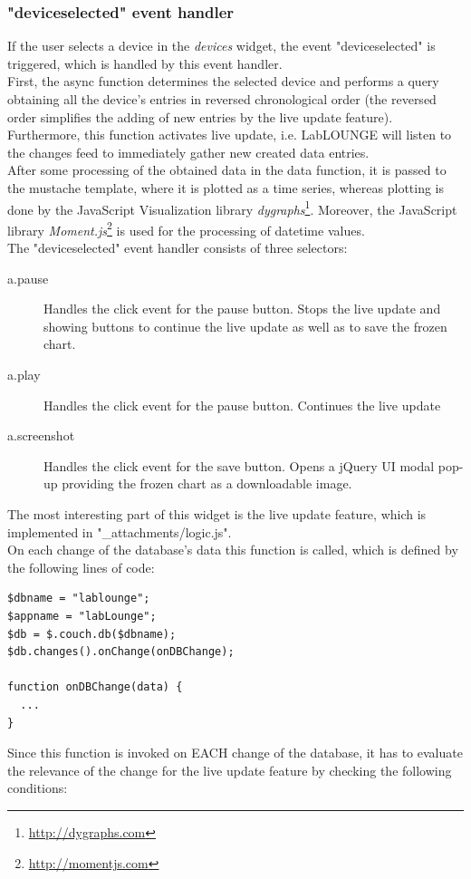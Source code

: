 \subsubsection{"deviceselected" event handler}
\label{couchapp:labloungedeveloper:main:deviceselected}
If the user selects a device in the \emph{devices} widget, the event "deviceselected" is triggered, which is handled by this event handler.\\
First, the async function determines the selected device and performs a query obtaining all the device's entries in reversed chronological order (the reversed order simplifies the adding of new entries by the live update feature). Furthermore, this function activates live update, i.e. LabLOUNGE will listen to the changes feed to immediately gather new created data entries.\\
After some processing of the obtained data in the data function, it is passed to the mustache template, where it is plotted as a time series, whereas plotting is done by the JavaScript Visualization library \emph{dygraphs}\footnote{\url{http://dygraphs.com}}. Moreover, the JavaScript library \emph{Moment.js}\footnote{\url{http://momentjs.com}} is used for the processing of datetime values.\\
The "deviceselected" event handler consists of three selectors:
\begin{description}
\item[a.pause] Handles the click event for the pause button. Stops the live update and showing buttons to continue the live update as well as to save the frozen chart.
\item[a.play] Handles the click event for the pause button. Continues the live update
\item[a.screenshot] Handles the click event for the save button. Opens a jQuery UI modal pop-up providing the frozen chart as a downloadable image.
\end{description}
The most interesting part of this widget is the live update feature, which is implemented in "\_attachments/logic.js".\\
On each change of the database's data this function is called, which is defined by the following lines of code:
\begin{lstlisting}
$dbname = "lablounge";
$appname = "labLounge";
$db = $.couch.db($dbname);
$db.changes().onChange(onDBChange);

function onDBChange(data) {
  ...
}
\end{lstlisting}
Since this function is invoked on EACH change of the database, it has to evaluate the relevance of the change for the live update feature by checking the following conditions:
